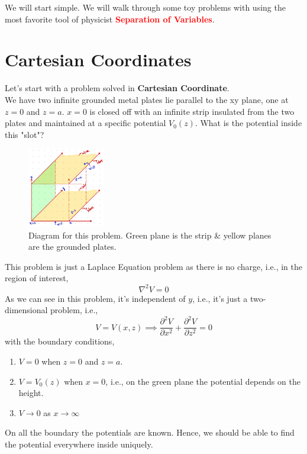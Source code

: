 \documentclass{article}
\begin{document}
We will start simple. We will walk through some toy problems with using the most favorite tool of physicist \textbf{\textcolor{red}{Separation of Variables}}.\\
\section{Cartesian Coordinates}
Let's start with a problem solved in \textbf{Cartesian Coordinate}.\\
We have two infinite grounded metal plates lie parallel to the xy plane, one at $z=0$ and $z=a$. $x=0$ is closed off with an infinite strip insulated from the two plates and maintained at a specific potential $V_0(z)$. What is the potential inside this "slot"?
\begin{figure}[H]
    \centering
    \includegraphics[width=0.3\textwidth]{Images/cartesian_lap_p1.jpeg}
    \caption{Diagram for this problem. Green plane is the strip \& yellow planes are the grounded plates.}
    \label{cart_sep_var1}
\end{figure}
This problem is just a Laplace Equation problem as there is no charge, i.e., in the region of interest,
\begin{equation*}
    \nabla^2V=0
\end{equation*}
As we can see in this problem, it's independent of $y$, i.e., it's just a two-dimensional problem, i.e., 
\begin{equation*}
    V = V(x,z) \implies \frac{\partial^2 V}{\partial x^2} + \frac{\partial^2 V}{\partial z^2} = 0
\end{equation*}
with the boundary conditions,
\begin{enumerate}
    \item $V=0$ when $z=0$ and $z=a$.
    \item $V=V_0(z)$ when $x=0$, i.e., on the green plane the potential depends on the height.
    \item $V\to 0$ as $x\to \infty$
\end{enumerate}
\begin{note}
    On all the boundary the potentials are known. Hence, we should be able to find the potential everywhere inside uniquely.
\end{note}
\end{document}
